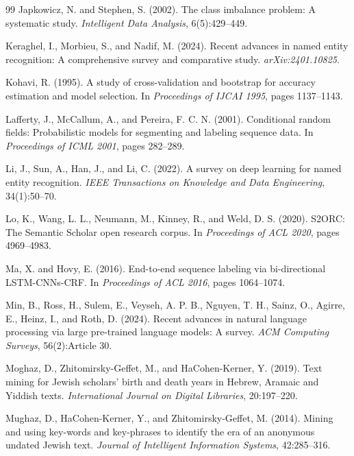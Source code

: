 \documentclass[12pt,a4paper]{report}
\begin{document}
\begin{thebibliography}{99}
Japkowicz, N. and Stephen, S. (2002).
The class imbalance problem: A systematic study.
\emph{Intelligent Data Analysis}, 6(5):429--449.

Keraghel, I., Morbieu, S., and Nadif, M. (2024).
Recent advances in named entity recognition: A comprehensive survey and comparative study.
\emph{arXiv:2401.10825}.

Kohavi, R. (1995).
A study of cross-validation and bootstrap for accuracy estimation and model selection.
In \emph{Proceedings of IJCAI 1995}, pages 1137--1143.

Lafferty, J., McCallum, A., and Pereira, F. C. N. (2001).
Conditional random fields: Probabilistic models for segmenting and labeling sequence data.
In \emph{Proceedings of ICML 2001}, pages 282--289.

Li, J., Sun, A., Han, J., and Li, C. (2022).
A survey on deep learning for named entity recognition.
\emph{IEEE Transactions on Knowledge and Data Engineering}, 34(1):50--70.

Lo, K., Wang, L. L., Neumann, M., Kinney, R., and Weld, D. S. (2020).
S2ORC: The Semantic Scholar open research corpus.
In \emph{Proceedings of ACL 2020}, pages 4969--4983.

Ma, X. and Hovy, E. (2016).
End-to-end sequence labeling via bi-directional LSTM-CNNs-CRF.
In \emph{Proceedings of ACL 2016}, pages 1064--1074.

Min, B., Ross, H., Sulem, E., Veyseh, A. P. B., Nguyen, T. H., Sainz, O., Agirre, E., Heinz, I., and Roth, D. (2024).
Recent advances in natural language processing via large pre-trained language models: A survey.
\emph{ACM Computing Surveys}, 56(2):Article 30.

Moghaz, D., Zhitomirsky-Geffet, M., and HaCohen-Kerner, Y. (2019).
Text mining for Jewish scholars' birth and death years in Hebrew, Aramaic and Yiddish texts.
\emph{International Journal on Digital Libraries}, 20:197--220.

Mughaz, D., HaCohen-Kerner, Y., and Zhitomirsky-Geffet, M. (2014).
Mining and using key-words and key-phrases to identify the era of an anonymous undated Jewish text.
\emph{Journal of Intelligent Information Systems}, 42:285--316.


\end{thebibliography}
\end{document}
